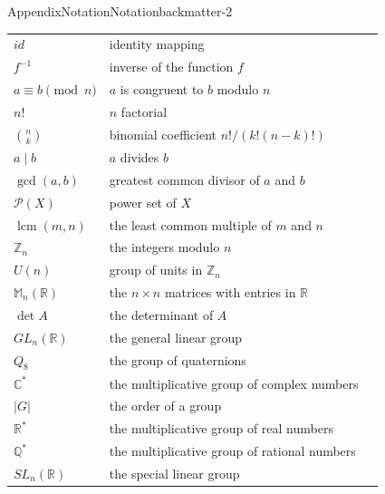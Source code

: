 \documentclass[oneside,10pt,]{book}
\numberwithin{equation}{section}
\newcommand{\lcm}{\operatorname{lcm}}
\begin{document}
\begin{appendixptx}{Appendix}{Notation}{}{Notation}{}{}{backmatter-2}
\begin{longtable}[l]{lp{}r}
\(id\)&identity mapping&\pageref{section-sets-and-equivalence-relations-3-20-19}\\
\(f^{-1}\)&inverse of the function \(f\)&\pageref{section-sets-and-equivalence-relations-3-20-20}\\
\(a \equiv b \pmod{n}\)&\(a\) is congruent to \(b\) modulo \(n\)&\pageref{example-sets-congruent-integers-2-18}\\
\(n!\)&\(n\) factorial&\pageref{example-integers-binomial-theorem-2-8}\\
\(\binom{n}{k}\)&binomial coefficient \(n!/(k!(n-k)!)\)&\pageref{example-integers-binomial-theorem-2-9}\\
\(a \mid b\)&\(a\) divides \(b\)&\pageref{section-division-algorithm-2-3-24}\\
\(\gcd(a, b)\)&greatest common divisor of \(a\) and \(b\)&\pageref{section-division-algorithm-2-3-25}\\
\(\mathcal P(X)\)&power set of \(X\)&\pageref{exercises-integers-13-2-1-6}\\
\(\lcm(m,n)\)&the least common multiple of \(m\) and \(n\)&\pageref{exercises-integers-24-1-1-14}\\
\(\mathbb Z_n\)&the integers modulo \(n\)&\pageref{section-mod-n-sym-5-4-10}\\
\(U(n)\)&group of units in \(\mathbb Z_n\)&\pageref{example-groups-z6-mult-3-8}\\
\(\mathbb M_n(\mathbb R)\)&the \(n \times n\) matrices with entries in \(\mathbb R\)&\pageref{example-groups-gl2-2-5}\\
\(\det A\)&the determinant of \(A\)&\pageref{example-groups-gl2-2-15}\\
\(GL_n(\mathbb R)\)&the general linear group&\pageref{example-groups-gl2-2-18}\\
\(Q_8\)&the group of quaternions&\pageref{example-groups-quaterions-2-13}\\
\(\mathbb C^*\)&the multiplicative group of complex numbers&\pageref{example-groups-c-star-2-2}\\
\(|G|\)&the order of a group&\pageref{section-groups-define-3-11-12}\\
\(\mathbb R^*\)&the multiplicative group of real numbers&\pageref{example-groups-multiplicative-subgroup-2-2}\\
\(\mathbb Q^*\)&the multiplicative group of rational numbers&\pageref{example-groups-multiplicative-subgroup-2-7}\\
\(SL_n(\mathbb R)\)&the special linear group&\pageref{example-groups-sl2-2-3}\\

\end{longtable}
\end{appendixptx}
\end{document}
